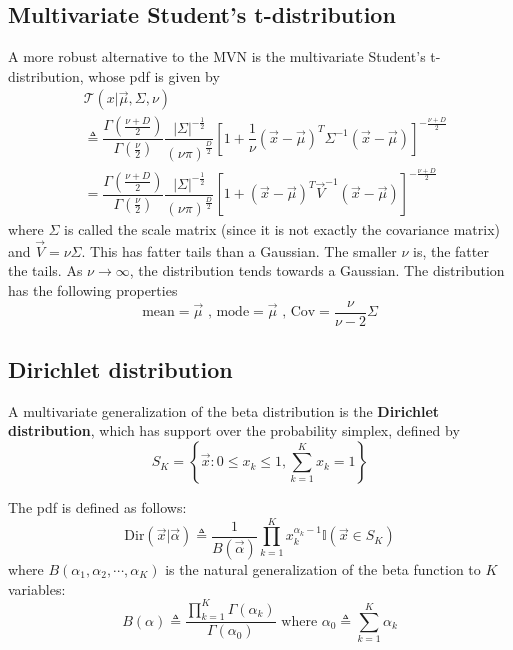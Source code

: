 \subsection{Multivariate Student's t-distribution}
A more robust alternative to the MVN is the multivariate Student's t-distribution, whose pdf is given by
\begin{align}
& \mathcal{T}(x|\vec{\mu},\Sigma,\nu) \nonumber \\
& \triangleq \dfrac{\Gamma(\frac{\nu+D}{2})}{\Gamma(\frac{\nu}{2})}\dfrac{|\Sigma|^{-\frac{1}{2}}}{\left(\nu\pi\right)^{\frac{D}{2}}}\left[1+\dfrac{1}{\nu}\left(\vec{x}-\vec{\mu}\right)^T\Sigma^{-1}\left(\vec{x}-\vec{\mu}\right)\right]^{-\frac{\nu+D}{2}} \\
&= \dfrac{\Gamma(\frac{\nu+D}{2})}{\Gamma(\frac{\nu}{2})}\dfrac{|\Sigma|^{-\frac{1}{2}}}{\left(\nu\pi\right)^{\frac{D}{2}}}\left[1+\left(\vec{x}-\vec{\mu}\right)^T\vec{V}^{-1}\left(\vec{x}-\vec{\mu}\right)\right]^{-\frac{\nu+D}{2}}
\end{align}
where $\Sigma$ is called the scale matrix (since it is not exactly the covariance matrix) and $\vec{V}=\nu\Sigma$. This has fatter tails than a Gaussian. The smaller $\nu$ is, the fatter the tails. As $\nu \rightarrow \infty$, the distribution tends towards a Gaussian. The distribution has the following properties
\begin{equation}
\text{mean}=\vec{\mu} \text{ , mode}=\vec{\mu} \text{ , Cov}= \dfrac{\nu}{\nu-2}\Sigma
\end{equation}


\subsection{Dirichlet distribution}
A multivariate generalization of the beta distribution is the \textbf{Dirichlet distribution}, which has
support over the probability simplex, defined by
\begin{equation}
S_K=\left\{\vec{x}:0 \leq x_k \leq 1,\sum\limits_{k=1}^K x_k=1\right\}
\end{equation}

The pdf is defined as follows:
\begin{equation}
\text{Dir}(\vec{x}|\vec{\alpha}) \triangleq \dfrac{1}{B(\vec{\alpha})}\prod\limits_{k=1}^K x_k^{\alpha_k-1}\mathbb{I}(\vec{x} \in S_K)
\end{equation}
where $B(\alpha_1,\alpha_2,\cdots,\alpha_K)$ is the natural generalization of the beta function to $K$ variables:
\begin{equation}
B(\alpha) \triangleq \dfrac{\prod_{k=1}^K \Gamma(\alpha_k)}{\Gamma(\alpha_0)} \text{ where } \alpha_0 \triangleq \sum_{k=1}^K \alpha_k
\end{equation}

